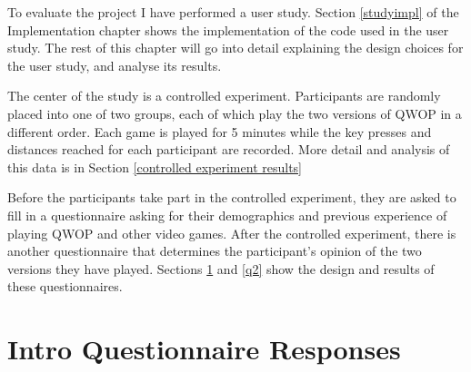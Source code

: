 \documentclass[12pt,a4paper,twoside,openright]{report}
\begin{document}





To evaluate the project I have performed a user study. 
Section \ref{studyimpl} of the Implementation chapter shows the implementation of the code used in the user study.
The rest of this chapter will go into detail explaining the design choices for the user study, and analyse its results.

The center of the study is a controlled experiment. Participants are randomly placed into one of two groups, each of which play the two versions of QWOP in a different order.
Each game is played for 5 minutes while the key presses and distances reached for each participant are recorded. More detail and analysis of this data is in Section \ref{controlled experiment results}

Before the participants take part in the controlled experiment, they are asked to fill in a questionnaire asking for their demographics and previous experience of playing QWOP and other video games. After the controlled experiment, there is another questionnaire that determines the participant's opinion of the two versions they have played.
Sections \ref{q1} and \ref{q2} show the design and results of these questionnaires.





\section{Intro Questionnaire Responses}
\label{q1}
\end{document}
